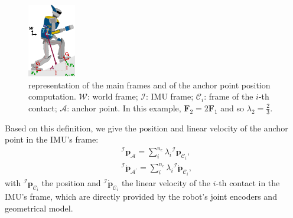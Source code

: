 \documentclass{IJCAS}
\begin{document}
\begin{figure}[!t]
\begin{center}
\includegraphics[width=0.5\columnwidth]{Uploaded/Images/framesAndAnchor.pdf} 
\vskip -0.5pc
\caption{representation of the main frames and of the anchor point position computation. $\mathcal{W}$: world frame; $\mathcal{I}$: IMU frame; $\mathcal{C}_{i}$: frame of the $i$-th contact; $\mathcal{A}$: anchor point. In this example, $\boldsymbol{F}_{2} = 2\boldsymbol{F}_{1}$ and so $\lambda_{2} = \frac{2}{3}$.}\label{fig:framesAndAnchor}
\end{center}
\vskip -1.5pc
\end{figure}

Based on this definition, we give the position and linear velocity of the anchor point in the IMU's frame:
\begin{align} 
&{^{\mathcal{I}}}\boldsymbol{p}_{\mathcal{A}} = \sum^{n_{c}}_{i} \lambda_{i}  {^{\mathcal{I}}} \boldsymbol{p}_{{\mathcal{C}}_{i}}, \label{eq:imuAnchorPos} \\
&{^{\mathcal{I}}} \dot{\boldsymbol{p}}_{\mathcal{A}^{\prime}} = \sum^{n_{c}}_{i} \lambda_{i}  {^{\mathcal{I}}} \dot{\boldsymbol{p}}_{{\mathcal{C}}_{i}}, \label{eq:imuAnchorVel}
\end{align} 
with ${^{\mathcal{I}}} \boldsymbol{p}_{{\mathcal{C}}_{i}}$ the position and ${^{\mathcal{I}}} \dot{\boldsymbol{p}}_{{\mathcal{C}}_{i}}$ the linear velocity of the $i$-th contact in the IMU's frame, which are directly provided by the robot's joint encoders and geometrical model.
\end{document}
